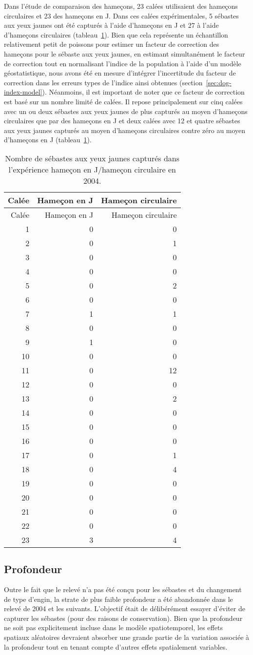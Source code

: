 \documentclass[11pt]{book}
\begin{document}
Dans l'étude de comparaison des hameçons, 23 calées utilisaient des hameçons circulaires et 23 des hameçons en J. Dans ces calées expérimentales, 5 sébastes aux yeux jaunes ont été capturés à l'aide d'hameçons en J et 27 à l'aide d'hameçons circulaires (tableau~\ref{tab:dogfish-hook-comparison}). Bien que cela représente un échantillon relativement petit de poissons pour estimer un facteur de correction des hameçons pour le sébaste aux yeux jaunes, en estimant simultanément le facteur de correction tout en normalisant l'indice de la population à l'aide d'un modèle géostatistique, nous avons été en mesure d'intégrer l'incertitude du facteur de correction dans les erreurs types de l'indice ainsi obtenues (section~\ref{sec:dog-index-model}). Néanmoins, il est important de noter que ce facteur de correction est basé sur un nombre limité de calées. Il repose principalement sur cinq calées avec un ou deux sébastes aux yeux jaunes de plus capturés au moyen d'hameçons circulaires que par des hameçons en J et deux calées avec 12 et quatre sébastes aux yeux jaunes capturés au moyen d'hameçons circulaires contre zéro au moyen d'hameçons en J (tableau~\ref{tab:dogfish-hook-comparison}).

\clearpage
\begin{longtable}[]{@{}rrr@{}}
\caption{\label{tab:dogfish-hook-comparison}Nombre de sébastes aux yeux jaunes capturés dans l'expérience hameçon en J/hameçon circulaire en 2004.}\tabularnewline
\toprule
Calée & Hameçon en J & Hameçon circulaire\tabularnewline
\midrule
\endfirsthead
\toprule
Calée & Hameçon en J & Hameçon circulaire\tabularnewline
\midrule
\endhead
1 & 0 & 0\tabularnewline
2 & 0 & 1\tabularnewline
3 & 0 & 0\tabularnewline
4 & 0 & 0\tabularnewline
5 & 0 & 2\tabularnewline
6 & 0 & 0\tabularnewline
7 & 1 & 1\tabularnewline
8 & 0 & 0\tabularnewline
9 & 1 & 0\tabularnewline
10 & 0 & 0\tabularnewline
11 & 0 & 12\tabularnewline
12 & 0 & 0\tabularnewline
13 & 0 & 2\tabularnewline
14 & 0 & 0\tabularnewline
15 & 0 & 0\tabularnewline
16 & 0 & 0\tabularnewline
17 & 0 & 1\tabularnewline
18 & 0 & 4\tabularnewline
19 & 0 & 0\tabularnewline
20 & 0 & 0\tabularnewline
21 & 0 & 0\tabularnewline
22 & 0 & 0\tabularnewline
23 & 3 & 4\tabularnewline
\bottomrule
\end{longtable}
\hypertarget{sec:dog-depth}{%
\subsection{Profondeur}\label{sec:dog-depth}}

Outre le fait que le relevé n'a pas été conçu pour les sébastes et du changement de type d'engin, la strate de plus faible profondeur a été abandonnée dans le relevé de 2004 et les suivants. L'objectif était de délibérément essayer d'éviter de capturer les sébastes (pour des raisons de conservation). Bien que la profondeur ne soit pas explicitement incluse dans le modèle spatiotemporel, les effets spatiaux aléatoires devraient absorber une grande partie de la variation associée à la profondeur tout en tenant compte d'autres effets spatialement variables.
\end{document}
